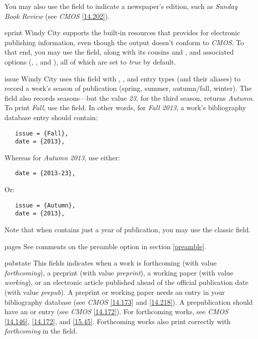 \documentclass[11pt,letterpaper,oneside]{article}
\begin{document}
\begin{marglist}
\begin{bibonly}
\nocite{swanson1999}
\end{bibonly}

\noindent You may also use the field to indicate a newspaper's
edition, such as \textit{Sunday Book Review} (see \textit{CMOS}
\ref{14.202}).

\item[eprint] Windy City supports the built-in resources that
\biblatex provides for electronic publishing information, even though
the output doesn't conform to \textit{CMOS}. To that end, you may use
the  field, along with its cousins
 and , and associated
options (, , and ), all of which are set
to \textit{true} by default.

\item[issue] Windy City uses this field with ,
, and  entry types (and their aliases)
to record a work's season of publication (spring, summer, autumn/fall,
winter). The  field also records seasons---but the value
\textit{23}, for the third season, returns \textit{Autumn}. To print
\textit{Fall}, use the  field. In other words, for
\textit{Fall 2013}, a work's bibliography database entry should
contain:

\begin{verbatim}
   issue = {Fall},
   date = {2013},
\end{verbatim}

\noindent Whereas for \textit{Autumn 2013}, use either:

\begin{verbatim}
   date = {2013-23},
\end{verbatim}

\noindent Or:

\begin{verbatim}
   issue = {Autumn},
   date = {2013},
\end{verbatim}

\noindent Note that when  contains just a year of
publication, you may use the classic  field.

\item[pages] See comments on the  preamble option in
section \ref{preamble}.

\item[pubstate] This fields indicates when a work is forthcoming (with
value \textit{forthcoming}), a preprint (with value
\textit{preprint}), a working paper (with value \textit{working}), or
an electronic article published ahead of the official publication date
(with value \textit{prepub}). A preprint or working paper needs an
 entry in your bibliography database (see
\textit{CMOS} \ref{14.173} and \ref{14.218}). A prepublication should
have an  or  entry (see
\textit{CMOS} \ref{14.172}). For forthcoming works, see \textit{CMOS}
\ref{14.146}, \ref{14.172}, and \ref{15.45}. Forthcoming works also
print correctly with \textit{forthcoming} in the 
field.


\end{marglist}
\end{document}
